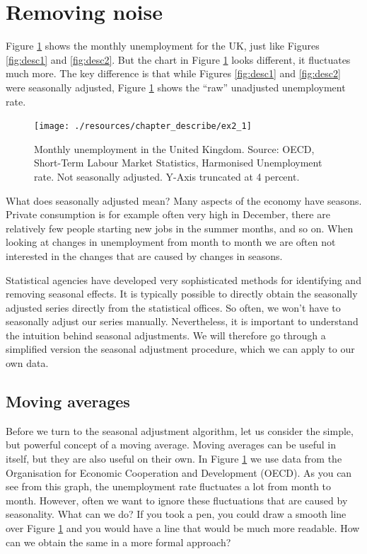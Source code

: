 \documentclass[
]{book}
\begin{document}
\hypertarget{removing-noise}{%
\section{Removing noise}\label{removing-noise}}

Figure \ref{fig:desc4} shows the monthly unemployment for the UK, just like Figures \ref{fig:desc1} and \ref{fig:desc2}. But the chart in Figure \ref{fig:desc4} looks different, it fluctuates much more. The key difference is that while Figures \ref{fig:desc1} and \ref{fig:desc2} were seasonally adjusted, Figure \ref{fig:desc4} shows the ``raw'' unadjusted unemployment rate.

\begin{figure}

{\centering \texttt{[image: ./resources/chapter\_describe/ex2\_1]} 

}

\caption{Monthly unemployment in the United Kingdom. Source: OECD, Short-Term Labour Market Statistics, Harmonised Unemployment rate. Not seasonally adjusted. Y-Axis truncated at 4 percent.}\label{fig:desc4}
\end{figure}

What does seasonally adjusted mean? Many aspects of the economy have seasons. Private consumption is for example often very high in December, there are relatively few people starting new jobs in the summer months, and so on. When looking at changes in unemployment from month to month we are often not interested in the changes that are caused by changes in seasons.

Statistical agencies have developed very sophisticated methods for identifying and removing seasonal effects. It is typically possible to directly obtain the seasonally adjusted series directly from the statistical offices. So often, we won't have to seasonally adjust our series manually. Nevertheless, it is important to understand the intuition behind seasonal adjustments. We will therefore go through a simplified version the seasonal adjustment procedure, which we can apply to our own data.

\hypertarget{moving-averages}{%
\subsection*{Moving averages}\label{moving-averages}}

Before we turn to the seasonal adjustment algorithm, let us consider the simple, but powerful concept of a moving average. Moving averages can be useful in itself, but they are also useful on their own. In Figure \ref{fig:desc4} we use data from the Organisation for Economic Cooperation and Development (OECD). As you can see from this graph, the unemployment rate fluctuates a lot from month to month. However, often we want to ignore these fluctuations that are caused by seasonality. What can we do? If you took a pen, you could draw a smooth line over Figure \ref{fig:desc4} and you would have a line that would be much more readable. How can we obtain the same in a more formal approach?
\end{document}
